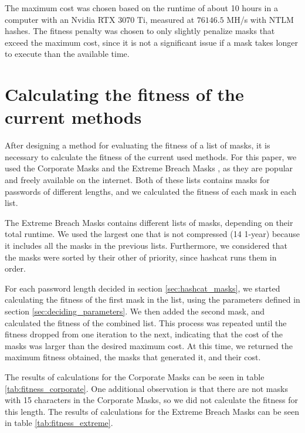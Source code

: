 \documentclass[sigconf,authordraft]{acmart}
\begin{document}
The maximum cost was chosen based on the runtime of about 10 hours in a computer with an Nvidia RTX 3070 Ti, measured at $76146.5$ MH/s with NTLM hashes.
The fitness penalty was chosen to only slightly penalize masks that exceed the maximum cost, since it is not a significant issue if a mask takes longer to execute than the available time.

\section{Calculating the fitness of the current methods}
\label{sec:calculating_baseline_fitness}

After designing a method for evaluating the fitness of a list of masks, it is necessary to calculate the fitness of the current used methods.
For this paper, we used the Corporate Masks \cite{corporate_masks} and the Extreme Breach Masks \cite{extreme_breach_masks}, as they are popular and freely available on the internet.
Both of these lists contains masks for passwords of different lengths, and we calculated the fitness of each mask in each list.

The Extreme Breach Masks contains different lists of masks, depending on their total runtime.
We used the largest one that is not compressed (14 1-year) because it includes all the masks in the previous lists.
Furthermore, we considered that the masks were sorted by their other of priority, since hashcat runs them in order.

For each password length decided in section \ref{sec:hashcat_masks}, we started calculating the fitness of the first mask in the list, using the parameters defined in section \ref{sec:deciding_parameters}.
We then added the second mask, and calculated the fitness of the combined list.
This process was repeated until the fitness dropped from one iteration to the next, indicating that the cost of the masks was larger than the desired maximum cost.
At this time, we returned the maximum fitness obtained, the masks that generated it, and their cost.

The results of calculations for the Corporate Masks can be seen in table \ref{tab:fitness_corporate}.
One additional observation is that there are not masks with 15 characters in the Corporate Masks, so we did not calculate the fitness for this length.
The results of calculations for the Extreme Breach Masks can be seen in table \ref{tab:fitness_extreme}.
\end{document}
